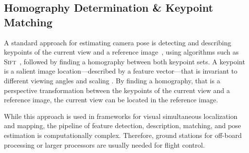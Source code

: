 \subsection{Homography Determination \& Keypoint Matching}
\label{sec:keypointmatching}

A standard approach for estimating camera pose is detecting and
describing keypoints of the current view and a reference image~\cite{se2002global}, using
algorithms such as \textsc{Sift}~\cite{lowe1999object}, followed by finding a homography between both keypoint sets. A
keypoint is a salient image location---described by a feature vector---that is invariant to different
viewing angles and scaling . By finding a homography, that is a perspective transformation between the keypoints of the current view and a reference image, the current view can be located in the reference image.


While this approach is used in frameworks for visual simultaneous localization and mapping, the pipeline of feature detection, description, matching, and pose estimation is computationally complex. Therefore, ground stations for off-board processing or larger processors are usually needed for flight control.  

